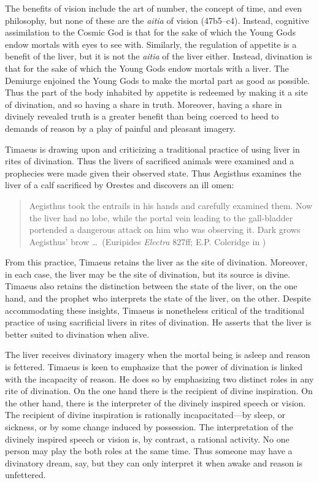 The benefits of vision include the art of number, the concept of time, and even philosophy, but none of these are the \emph{aitia} of vision (47b5--c4). Instead, cognitive assimilation to the Cosmic God is that for the sake of which the Young Gods endow mortals with eyes to see with. Similarly, the regulation of appetite is a benefit of the liver, but it is not the \emph{aitia} of the liver either. Instead, divination is that for the sake of which the Young Gods endow mortals with a liver. The Demiurge enjoined the Young Gods to make the mortal part as good as possible. Thus the part of the body inhabited by appetite is redeemed by making it a site of divination, and so having a share in truth. Moreover, having a share in divinely revealed truth is a greater benefit than being coerced to heed to demands of reason by a play of painful and pleasant imagery.

Timaeus is drawing upon and criticizing a traditional practice of using liver in rites of divination. Thus the livers of sacrificed animals were examined and a prophecies were made given their observed state. Thus Aegisthus examines the liver of a calf sacrificed by Orestes and discovers an ill omen:
\begin{quote}
	Aegisthus took the entrails in his hands and carefully examined them. Now the liver had no lobe, while the portal vein leading to the gall-bladder portended a dangerous attack on him who was observing it. Dark grows Aegis\-thus' brow \ldots\ (Euripides \emph{Electra} 827ff; E.P. Coleridge in \citealt[92]{Oates:1938la})
\end{quote}
From this practice, Timaeus retains the liver as the site of divination. Moreover, in each case, the liver may be the site of divination, but its source is divine. Timaeus also retains the distinction between the state of the liver, on the one hand, and the prophet who interprets the state of the liver, on the other. Despite accommodating these insights, Timaeus is nonetheless critical of the traditional practice of using sacrificial livers in rites of divination. He asserts that the liver is better suited to divination when alive.

The liver receives divinatory imagery when the mortal being is asleep and reason is fettered. Timaeus is keen to emphasize that the power of divination is linked with the incapacity of reason. He does so by emphasizing two distinct roles in any rite of divination. On the one hand there is the recipient of divine inspiration. On the other hand, there is the interpreter of the divinely inspired speech or vision. The recipient of divine inspiration is rationally incapacitated---by sleep, or sickness, or by some change induced by possession. The interpretation of the divinely inspired speech or vision is, by contrast, a rational activity. No one person may play the both roles at the same time. Thus someone may have a divinatory dream, say, but they can only interpret it when awake and reason is unfettered.

